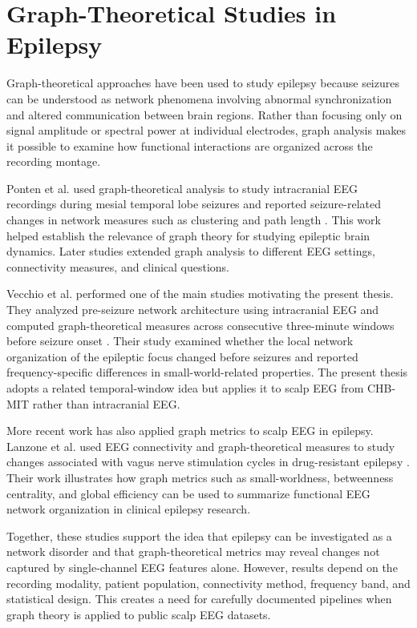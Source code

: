 \section{Graph-Theoretical Studies in Epilepsy}
\label{sec:background-graph-epilepsy}

Graph-theoretical approaches have been used to study epilepsy because seizures
can be understood as network phenomena involving abnormal synchronization and
altered communication between brain regions. Rather than focusing only on signal
amplitude or spectral power at individual electrodes, graph analysis makes it
possible to examine how functional interactions are organized across the
recording montage.

Ponten et al. used graph-theoretical analysis to study intracranial EEG
recordings during mesial temporal lobe seizures and reported seizure-related
changes in network measures such as clustering and path length
\cite{Ponten2007}. This work helped establish the relevance of graph theory for
studying epileptic brain dynamics. Later studies extended graph analysis to
different EEG settings, connectivity measures, and clinical questions.

Vecchio et al. performed one of the main studies motivating the present thesis.
They analyzed pre-seizure network architecture using intracranial EEG and
computed graph-theoretical measures across consecutive three-minute windows
before seizure onset \cite{Vecchio2016}. Their study examined whether the local
network organization of the epileptic focus changed before seizures and reported
frequency-specific differences in small-world-related properties. The present
thesis adopts a related temporal-window idea but applies it to scalp EEG from
CHB-MIT rather than intracranial EEG.

More recent work has also applied graph metrics to scalp EEG in epilepsy.
Lanzone et al. used EEG connectivity and graph-theoretical measures to study
changes associated with vagus nerve stimulation cycles in drug-resistant
epilepsy \cite{Lanzone2022}. Their work illustrates how graph metrics such as
small-worldness, betweenness centrality, and global efficiency can be used to
summarize functional EEG network organization in clinical epilepsy research.

Together, these studies support the idea that epilepsy can be investigated as a
network disorder and that graph-theoretical metrics may reveal changes not
captured by single-channel EEG features alone. However, results depend on the
recording modality, patient population, connectivity method, frequency band,
and statistical design. This creates a need for carefully documented pipelines
when graph theory is applied to public scalp EEG datasets.

